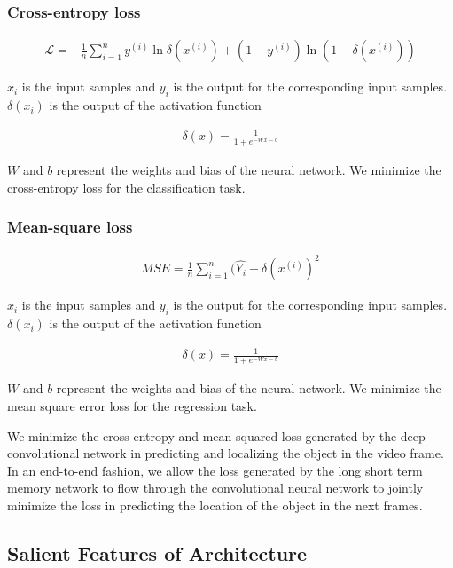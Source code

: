 \documentclass[sigconf]{acmart}
\begin{document}
\subsubsection{Cross-entropy loss}

\begin{align} \label{eqn9}
{\mathcal{L} = -\frac{1}{n} \sum_{i=1}^n y^{(i)} \ln \delta(x^{(i)}) + \left(1 - y^{(i)}\right) \ln \left(1 - \delta(x^{(i)})\right)}
\end{align}

$x_i$ is the input samples and $y_i$ is the output for the corresponding input samples. $\delta(x_i)$ is the output of the activation function

\begin{align} \label{eqn10}
{\delta(x) = \frac{1}{1 + e^{-Wx-b}}}
\end{align}

$W$ and $b$ represent the weights and bias of the neural network. We minimize the cross-entropy loss for the classification task.

\subsubsection{Mean-square loss}

\begin{align} \label{eqn11}
{MSE={\frac  {1}{n}}\sum _{{i=1}}^{n}({\hat{Y_{i}}}-\delta(x^{(i)})^{2}}
\end{align}

$x_i$ is the input samples and $y_i$ is the output for the corresponding input samples. $\delta(x_i)$ is the output of the activation function

\begin{align} \label{eqn1000}
{\delta(x) = \frac{1}{1 + e^{-Wx-b}}}
\end{align}

$W$ and $b$ represent the weights and bias of the neural network. We minimize the mean square error loss for the regression task.

We minimize the cross-entropy and mean squared loss generated by the deep convolutional network in predicting and localizing the object in the video frame. In an end-to-end fashion, we allow the loss generated by the long short term memory network to flow through the convolutional neural network to jointly minimize the loss in predicting the location of the object in the next frames. 

\subsection{Salient Features of Architecture} \label{arch}
\end{document}
